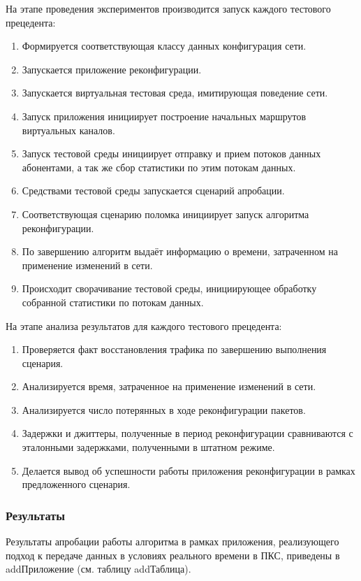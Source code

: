 \documentclass[12pt, a4paper]{article}
\begin{document}
На этапе проведения экспериментов производится запуск каждого тестового прецедента:
\begin{enumerate}
	\item Формируется соответствующая классу данных конфигурация сети.
	\item Запускается приложение реконфигурации.
	\item Запускается виртуальная тестовая среда, имитирующая поведение сети.
	\item Запуск приложения инициирует построение начальных маршрутов виртуальных каналов.
	\item Запуск тестовой среды инициирует отправку и прием потоков данных абонентами, а так же сбор статистики по этим потокам данных.
	\item Средствами тестовой среды запускается сценарий апробации.
	\item Соответствующая сценарию поломка инициирует запуск алгоритма реконфигурации.
	\item По завершению алгоритм выдаёт информацию о времени, затраченном на применение изменений в сети.
	\item Происходит сворачивание тестовой среды, инициирующее обработку собранной статистики по потокам данных.
\end{enumerate}

На этапе анализа результатов для каждого тестового прецедента:
\begin{enumerate}
	\item Проверяется факт восстановления трафика по завершению выполнения сценария.
	\item Анализируется время, затраченное на применение изменений в сети.
	\item Анализируется число потерянных в ходе реконфигурации пакетов.
	\item Задержки и джиттеры, полученные в период реконфигурации сравниваются с эталонными задержками, полученными в штатном режиме.
	\item Делается вывод об успешности работы приложения реконфигурации в рамках предложенного сценария.
\end{enumerate}

\subsubsection{Результаты}

Результаты апробации работы алгоритма в рамках приложения, реализующего подход к передаче данных в условиях реального времени в ПКС, приведены в addПриложение (см. таблицу addТаблица).
\end{document}
